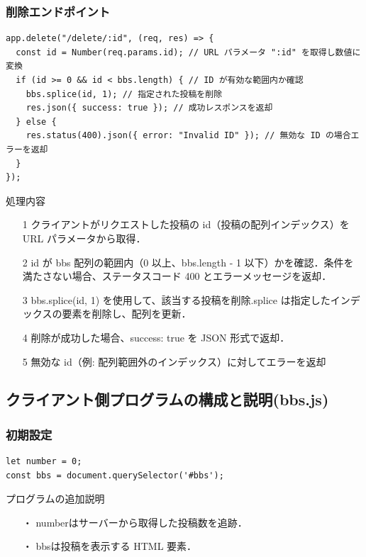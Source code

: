 \documentclass[uplatex,dvipdfmx]{jsarticle}
\begin{document}
\subsubsection{ 削除エンドポイント}
\begin{lstlisting}[label=g]
app.delete("/delete/:id", (req, res) => {
  const id = Number(req.params.id); // URL パラメータ ":id" を取得し数値に変換
  if (id >= 0 && id < bbs.length) { // ID が有効な範囲内か確認
    bbs.splice(id, 1); // 指定された投稿を削除
    res.json({ success: true }); // 成功レスポンスを返却
  } else {
    res.status(400).json({ error: "Invalid ID" }); // 無効な ID の場合エラーを返却
  }
});
\end{lstlisting}

\begin{itembox}[c]{処理内容}
    \begin{enumerate}
        \setlength{\leftskip}{0pt}
        \item[1]クライアントがリクエストした投稿の id（投稿の配列インデックス）を URL パラメータから取得．
        \item[2]id が bbs 配列の範囲内（0 以上、bbs.length - 1 以下）かを確認．条件を満たさない場合、ステータスコード 400 とエラーメッセージを返却．
        \item[3]bbs.splice(id, 1) を使用して、該当する投稿を削除.splice は指定したインデックスの要素を削除し、配列を更新．
        \item[4]削除が成功した場合、success: true を JSON 形式で返却．
        \item[5]無効な id（例: 配列範囲外のインデックス）に対してエラーを返却
    \end{enumerate}
\end{itembox}


\subsection{クライアント側プログラムの構成と説明(bbs.js)}

\subsubsection{初期設定}

\begin{lstlisting}[label=h]
let number = 0;
const bbs = document.querySelector('#bbs');
\end{lstlisting}


\begin{itembox}[c]{プログラムの追加説明}
    \begin{enumerate}
        \setlength{\leftskip}{0pt}
        \item[・]numberはサーバーから取得した投稿数を追跡．
        \item[・]bbsは投稿を表示する HTML 要素．
    \end{enumerate}
\end{itembox}
\end{document}
